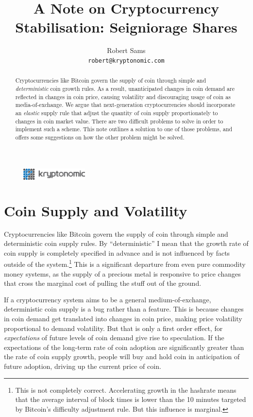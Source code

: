 \documentclass[twocolumn]{article}
\begin{document}
\onecolumn
\begin{figure}[b!]
\centering
\includegraphics[keepaspectratio, width=0.3\textwidth]{./logo.png}
\end{figure}
\title{A Note on Cryptocurrency Stabilisation: Seigniorage Shares}
\usdate
\author{Robert Sams\\\texttt{robert@kryptonomic.com}}
\maketitle
\begin{abstract}
  Cryptocurrencies like Bitcoin govern the supply of coin through
  simple and \emph{deterministic} coin growth rules. As a result,
  unanticipated changes in coin demand are reflected in changes in
  coin price, causing volatility and discouraging usage of coin as
  media-of-exchange. We argue that next-generation cryptocurrencies
  should incorporate an \emph{elastic} supply rule that adjust the
  quantity of coin supply proportionately to changes in coin market
  value. There are two difficult problems to solve in order to
  implement such a scheme. This note outlines a solution to one of
  those problems, and offers some suggestions on how the other problem
  might be solved.
\end{abstract}
\titlepage


\twocolumn
\section*{Coin Supply and Volatility}
Cryptocurrencies like Bitcoin govern the supply of coin through simple
and deterministic coin supply rules. By ``deterministic'' I mean that
the growth rate of coin supply is completely specified in advance and
is not influenced by facts outside of the system.\footnote{This is not
  completely correct. Accelerating growth in the hashrate means that
  the average interval of block times is lower than the 10 minutes
  targeted by Bitcoin's difficulty adjustment rule. But this
  influence is marginal.} This is a significant departure from even
pure commodity money systems, as the supply of a precious metal is
responsive to price changes that cross the marginal cost of pulling
the stuff out of the ground.

If a cryptocurrency system aims to be a general medium-of-exchange,
deterministic coin supply is a bug rather than a feature. This is
because changes in coin demand get translated into changes in coin
price, making price volatility proportional to demand volatility. But
that is only a first order effect, for \emph{expectations} of future
levels of coin demand give rise to speculation. If the expectations of
the long-term rate of coin adoption are significantly greater than the
rate of coin supply growth, people will buy and hold coin in
anticipation of future adoption, driving up the current price of coin.
\end{document}
